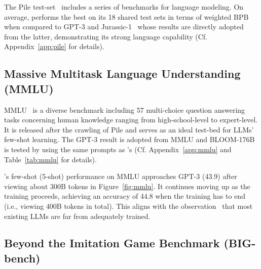 The Pile test-set~\citep{gao2020pile} includes a series of benchmarks for language modeling.
On average, \glm performs the best on its 18 shared test sets in terms of weighted BPB when compared to GPT-3 and Jurassic-1~\citep{lieber2021jurassic} whose results are directly adopted from the latter, demonstrating its strong language capability (Cf. Appendix~\ref{app:pile} for details).

\subsection{Massive Multitask Language Understanding (MMLU)} \label{sec:mmlu}

MMLU~\citep{hendrycks2021measuring} is a diverse benchmark including 57 multi-choice question answering tasks concerning human knowledge ranging from high-school-level to expert-level. 
It is released after the crawling of Pile and serves as an ideal test-bed for LLMs' few-shot learning.
The GPT-3 result is adopted from MMLU and BLOOM-176B is tested by using the same prompts as \glm's 
(Cf. Appendix~\ref{app:mmlu} and Table~\ref{tab:mmlu} for details).

\glm's few-shot (5-shot) performance on MMLU approaches GPT-3 (43.9) after viewing about 300B tokens in Figure~\ref{fig:mmlu}. 
It continues moving up as the training proceeds, achieving an accuracy of 44.8 when the training has to end (i.e., viewing 400B tokens in total).  %
This aligns with the observation~\citep{hoffmann2022training} that most existing LLMs are far from adequately trained. 

\subsection{Beyond the Imitation Game Benchmark (BIG-bench)} \label{sec:big-bench}

